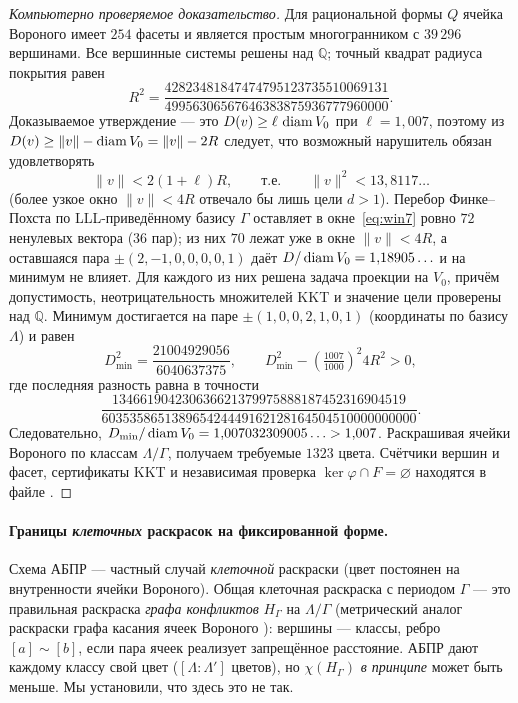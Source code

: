 \begin{proof}[Компьютерно проверяемое доказательство]
Для рациональной формы $Q$ ячейка Вороного имеет $254$ фасеты и является
простым многогранником с $39\,296$ вершинами. Все вершинные системы решены над
$\mathbb Q$; точный квадрат радиуса покрытия равен
\[
 R^2=
 \frac{42823481847474795123735510069131}
 {49956306567646383875936777960000}.
\]
Доказываемое утверждение --- это $D(v)\ge\ell\,\operatorname{diam} V_0$ при $\ell=1{,}007$,
поэтому из $D(v)\ge\|v\|-\operatorname{diam} V_0=\|v\|-2R$ следует, что возможный нарушитель
обязан удовлетворять
\begin{equation}\label{eq:win7}
 \|v\|<2(1+\ell)R,\qquad\text{т.е.}\qquad\|v\|^2<13{,}8117\ldots
\end{equation}
(более узкое окно $\|v\|<4R$ отвечало бы лишь цели $d>1$). Перебор Финке--Похста
по LLL-приведённому базису $\Gamma$ оставляет в окне~\eqref{eq:win7} ровно $72$
ненулевых вектора ($36$ пар); из них $70$ лежат уже в окне $\|v\|<4R$, а
оставшаяся пара $\pm(2,-1,0,0,0,0,1)$ даёт $D/\operatorname{diam} V_0=1{,}18905\ldots$ и на
минимум не влияет. Для каждого из них решена задача проекции на $V_0$,
причём допустимость, неотрицательность множителей KKT и значение цели проверены
над $\mathbb Q$. Минимум достигается на паре
$\pm(1,0,0,2,1,0,1)$ (координаты по базису $\Lambda$) и равен
\[
 D_{\min}^2=\frac{21004929056}{6040637375},\qquad
 D_{\min}^2-\left(\tfrac{1007}{1000}\right)^2 4R^2>0,
\]
где последняя разность равна в точности
\[
 \frac{134661904230636621379975888187452316904519}
 {603535865138965424449162128164504510000000000}.
\]
Следовательно,
$D_{\min}/\operatorname{diam} V_0=1{,}007032309005\ldots>1{,}007$.
Раскрашивая ячейки Вороного по классам $\Lambda/\Gamma$, получаем требуемые
$1323$ цвета. Счётчики вершин и фасет, сертификаты KKT и независимая проверка
$\ker\varphi\cap F=\varnothing$ находятся в файле
.
\end{proof}

\paragraph{Границы \emph{клеточных} раскрасок на фиксированной форме.}
Схема АБПР --- частный случай \emph{клеточной} раскраски (цвет
постоянен на внутренности ячейки Вороного). Общая клеточная раскраска с периодом
$\Gamma$ --- это правильная раскраска \emph{графа конфликтов} $H_\Gamma$ на
$\Lambda/\Gamma$ (метрический аналог раскраски графа касания ячеек Вороного
\cite{DSMMV}): вершины --- классы, ребро $[a]\!\sim\![b]$, если пара ячеек
реализует запрещённое расстояние. АБПР дают каждому классу свой цвет
($[\Lambda:\Lambda']$ цветов), но $\chi(H_\Gamma)$ \emph{в принципе} может быть
меньше. Мы установили, что здесь это не так.

